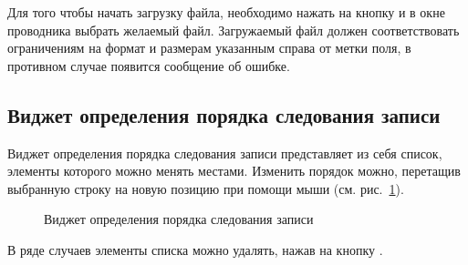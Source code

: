 Для того чтобы начать загрузку файла, необходимо нажать на кнопку  и в окне проводника выбрать желаемый файл. Загружаемый файл должен соответствовать ограничениям на формат и размерам указанным справа от метки поля, в противном случае появится сообщение об ошибке.

\subsection{Виджет определения порядка следования записи}
\label{widget:ordering}
Виджет определения порядка следования записи представляет из себя список, элементы которого можно менять местами. Изменить порядок можно, перетащив выбранную строку на новую позицию при помощи мыши (см. рис.~\ref{img:widgect:ordered_list}).

\begin{figure}[H]
	\caption{Виджет определения порядка следования записи}
	\label{img:widgect:ordered_list}
\end{figure}

В ряде случаев элементы списка можно удалять, нажав на кнопку .

